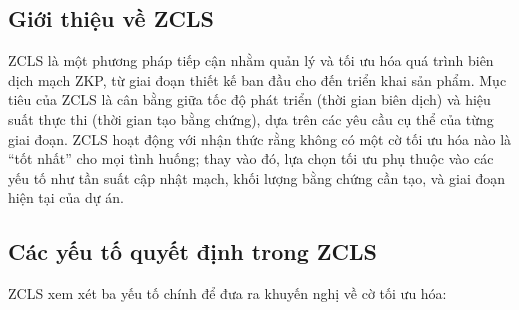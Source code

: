 \subsection{Giới thiệu về ZCLS}
ZCLS là một phương pháp tiếp cận nhằm quản lý và tối ưu hóa quá trình biên dịch mạch ZKP, từ giai đoạn thiết kế ban đầu cho đến triển khai sản phẩm. Mục tiêu của ZCLS là cân bằng giữa tốc độ phát triển (thời gian biên dịch) và hiệu suất thực thi (thời gian tạo bằng chứng), dựa trên các yêu cầu cụ thể của từng giai đoạn. ZCLS hoạt động với nhận thức rằng không có một cờ tối ưu hóa nào là ``tốt nhất'' cho mọi tình huống; thay vào đó, lựa chọn tối ưu phụ thuộc vào các yếu tố như tần suất cập nhật mạch, khối lượng bằng chứng cần tạo, và giai đoạn hiện tại của dự án.

\subsection{Các yếu tố quyết định trong ZCLS}
ZCLS xem xét ba yếu tố chính để đưa ra khuyến nghị về cờ tối ưu hóa:
